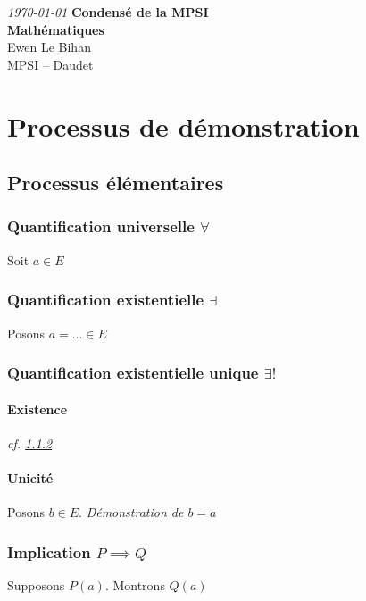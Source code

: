 \documentclass{article}
\begin{document}
\begin{titlepage}
	\begin{center}
		\textit{\today}
		\vfill
		\textbf{\LARGE{Condensé de la MPSI}\\\Large{Mathématiques}}\\
		\vfill
		\large{Ewen Le Bihan\\MPSI -- Daudet}
	\end{center}
\end{titlepage}

\newpage
\tableofcontents
\newpage

\section{Processus de démonstration}
\subsection{Processus élémentaires}
\subsubsection{Quantification universelle $\forall$}
\label{quantification_universelle}
Soit $a \in E$

\subsubsection{Quantification existentielle $\exists$}
\label{quantification_existentielle}
Posons $a = \ldots \in E$

\subsubsection{Quantification existentielle unique $\exists!$}
\paragraph{Existence}
\emph{cf. \ref{quantification_existentielle}} 

\paragraph{Unicité}
Posons $b \in E$.
\emph{Démonstration de $b = a$} 

\subsubsection{Implication $P \implies Q$}
\label{implication}
Supposons $P(a)$. Montrons $Q(a)$
\end{document}
